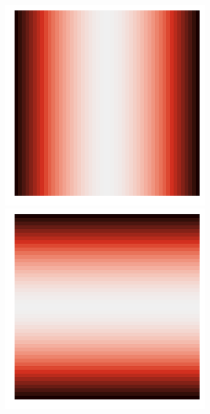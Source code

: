 \documentclass{article}
\begin{document}
\begin{figure}
\begin{subfigure}{0.3\textwidth}
 		\includegraphics[width=\linewidth]{figures/p_smooth3}\\
 		\includegraphics[width=\linewidth]{figures/p_smooth4}\\

\end{subfigure}
\end{figure}
\end{document}
